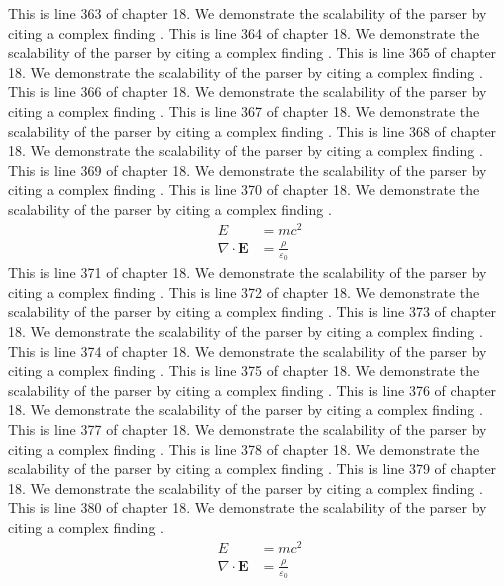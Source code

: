 This is line 363 of chapter 18. We demonstrate the scalability of the parser by citing a complex finding \cite{ref18_363}.
This is line 364 of chapter 18. We demonstrate the scalability of the parser by citing a complex finding \cite{ref18_364}.
This is line 365 of chapter 18. We demonstrate the scalability of the parser by citing a complex finding \cite{ref18_365}.
This is line 366 of chapter 18. We demonstrate the scalability of the parser by citing a complex finding \cite{ref18_366}.
This is line 367 of chapter 18. We demonstrate the scalability of the parser by citing a complex finding \cite{ref18_367}.
This is line 368 of chapter 18. We demonstrate the scalability of the parser by citing a complex finding \cite{ref18_368}.
This is line 369 of chapter 18. We demonstrate the scalability of the parser by citing a complex finding \cite{ref18_369}.
This is line 370 of chapter 18. We demonstrate the scalability of the parser by citing a complex finding \cite{ref18_370}.
\begin{align*}
  E &= mc^2 \\
  \nabla \cdot \mathbf{E} &= \frac{\rho}{\varepsilon_0}
\end{align*}
This is line 371 of chapter 18. We demonstrate the scalability of the parser by citing a complex finding \cite{ref18_371}.
This is line 372 of chapter 18. We demonstrate the scalability of the parser by citing a complex finding \cite{ref18_372}.
This is line 373 of chapter 18. We demonstrate the scalability of the parser by citing a complex finding \cite{ref18_373}.
This is line 374 of chapter 18. We demonstrate the scalability of the parser by citing a complex finding \cite{ref18_374}.
This is line 375 of chapter 18. We demonstrate the scalability of the parser by citing a complex finding \cite{ref18_375}.
This is line 376 of chapter 18. We demonstrate the scalability of the parser by citing a complex finding \cite{ref18_376}.
This is line 377 of chapter 18. We demonstrate the scalability of the parser by citing a complex finding \cite{ref18_377}.
This is line 378 of chapter 18. We demonstrate the scalability of the parser by citing a complex finding \cite{ref18_378}.
This is line 379 of chapter 18. We demonstrate the scalability of the parser by citing a complex finding \cite{ref18_379}.
This is line 380 of chapter 18. We demonstrate the scalability of the parser by citing a complex finding \cite{ref18_380}.
\begin{align*}
  E &= mc^2 \\
  \nabla \cdot \mathbf{E} &= \frac{\rho}{\varepsilon_0}
\end{align*}
